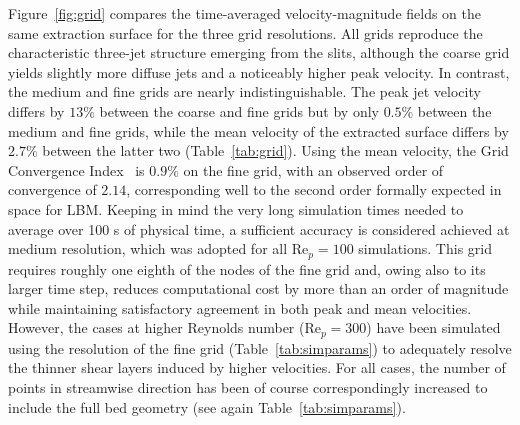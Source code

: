 Figure~\ref{fig:grid} compares the time-averaged velocity-magnitude fields on the same extraction surface for the three grid resolutions. All grids reproduce the characteristic three-jet structure emerging from the slits, although the coarse grid yields slightly more diffuse jets and a noticeably higher peak velocity. In contrast, the medium and fine grids are nearly indistinguishable. The peak jet velocity differs by $13\%$ between the coarse and fine grids but by only $0.5\%$ between the medium and fine grids, while the mean velocity of the extracted surface differs by $2.7\%$ between the latter two (Table~\ref{tab:grid}). Using the mean velocity, the Grid Convergence Index~\cite{celik2008} is $0.9\%$ on the fine grid, with an observed order of convergence of $2.14$, corresponding well to the second order formally expected in space for LBM. Keeping in mind the very long simulation times needed to average over 100 s of physical time, a sufficient accuracy is considered achieved at medium resolution, which was adopted for all Re$_p=100$ simulations. This grid requires roughly one eighth of the nodes of the fine grid and, owing also to its larger time step, reduces computational cost by more than an order of magnitude while maintaining satisfactory agreement in both peak and mean velocities. However, the cases at higher Reynolds number (Re$_p=300$) have been simulated using the resolution of the fine grid (Table~\ref{tab:simparams}) to adequately resolve the thinner shear layers induced by higher velocities. For all cases, the number of points in streamwise direction has been of course correspondingly increased to include the full bed geometry (see again Table~\ref{tab:simparams}).

